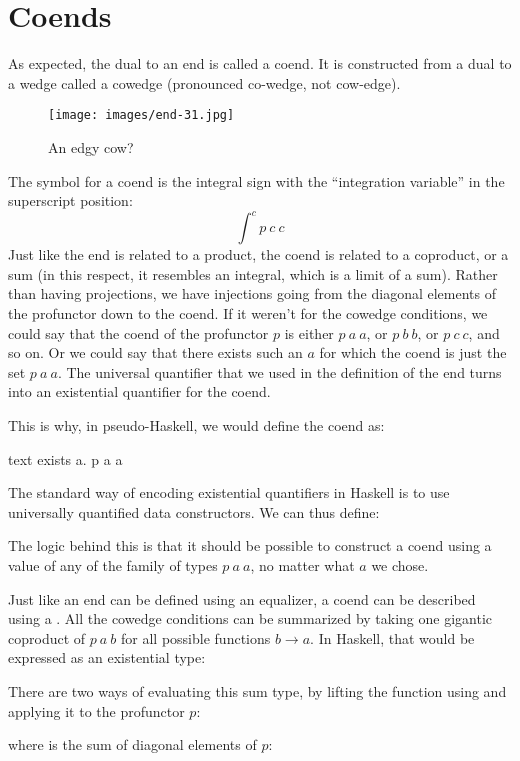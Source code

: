 \section{Coends}
As expected, the dual to an end is called a coend. It is constructed
from a dual to a wedge called a cowedge (pronounced co-wedge, not
cow-edge).

\begin{figure}[H]
  \centering
  \texttt{[image: images/end-31.jpg]}
  \caption{An edgy cow?}
\end{figure}

\noindent
The symbol for a coend is the integral sign with the ``integration
variable'' in the superscript position:
\[\int^c p\ c\ c\]
Just like the end is related to a product, the coend is related to a
coproduct, or a sum (in this respect, it resembles an integral, which is
a limit of a sum). Rather than having projections, we have injections
going from the diagonal elements of the profunctor down to the coend. If
it weren't for the cowedge conditions, we could say that the coend of
the profunctor $p$ is either $p\ a\ a$, or
$p\ b\ b$, or $p\ c\ c$, and so on. Or we could say that
there exists such an $a$ for which the coend is just the set
$p\ a\ a$. The universal quantifier that we used in the
definition of the end turns into an existential quantifier for the
coend.

This is why, in pseudo-Haskell, we would define the coend as:

\begin{snip}{text}
exists a. p a a
\end{snip}
The standard way of encoding existential quantifiers in Haskell is to
use universally quantified data constructors. We can thus define:

The logic behind this is that it should be possible to construct a coend
using a value of any of the family of types $p\ a\ a$, no matter
what $a$ we chose.

Just like an end can be defined using an equalizer, a coend can be
described using a . All the cowedge conditions can be
summarized by taking one gigantic coproduct of $p\ a\ b$ for all
possible functions $b \to a$. In Haskell, that would be
expressed as an existential type:

There are two ways of evaluating this sum type, by lifting the function
using  and applying it to the profunctor $p$:

where  is the sum of diagonal elements of $p$:

